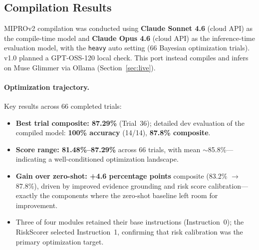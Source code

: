 \documentclass[11pt]{article}
\begin{document}
\subsection{Compilation Results}
\label{sec:compilation}

MIPROv2 compilation was conducted using \textbf{Claude Sonnet 4.6}
(cloud API) as the compile-time model and \textbf{Claude Opus 4.6}
(cloud API) as the inference-time evaluation model, with the
\texttt{heavy} auto setting (66 Bayesian optimization trials).
v1.0 planned a GPT-OSS-120 local check. This port instead compiles and
infers on Muse Glimmer via Ollama (Section~\ref{sec:live}).

\paragraph{Optimization trajectory.}
Key results across 66 completed trials:
\begin{itemize}[leftmargin=2em]
  \item \textbf{Best trial composite: 87.29\%} (Trial~36); detailed dev
    evaluation of the compiled model: \textbf{100\% accuracy} (14/14),
    \textbf{87.8\% composite}.
  \item \textbf{Score range: 81.48\%--87.29\%} across 66 trials,
    with mean $\sim$85.8\%---indicating a well-conditioned optimization
    landscape.
  \item \textbf{Gain over zero-shot: +4.6 percentage points} composite
    (83.2\% $\to$ 87.8\%), driven by improved evidence grounding and
    risk score calibration---exactly the components where the zero-shot
    baseline left room for improvement.
  \item Three of four modules retained their base instructions
    (Instruction~0); the RiskScorer selected Instruction~1, confirming
    that risk calibration was the primary optimization target.
\end{itemize}
\end{document}
